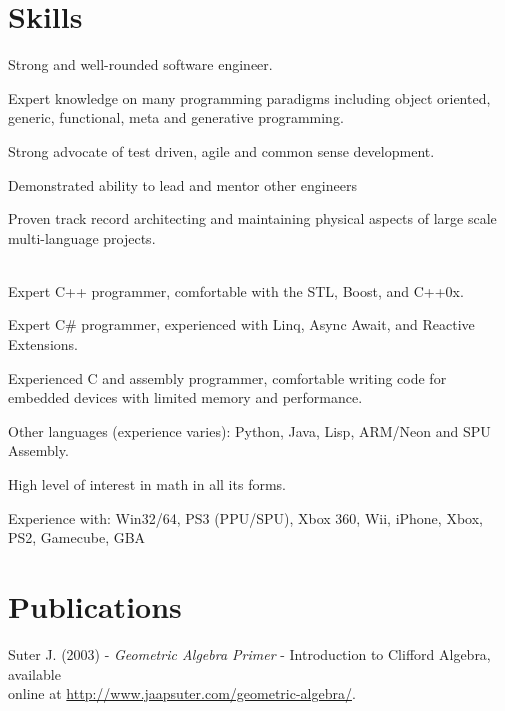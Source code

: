 \documentclass[margin, line]{resume}
\begin{document}
\begin{resume}
\section{\sc Skills}
\begin{list3}
\item Strong and well-rounded software engineer.
\item Expert knowledge on many programming paradigms including object oriented, generic, functional, meta and generative programming.
\item Strong advocate of test driven, agile and common sense development.
\item Demonstrated ability to lead and mentor other engineers
\item Proven track record architecting and maintaining physical aspects of large scale multi-language projects.
\\
\\
\item Expert C++ programmer, comfortable with the STL, Boost, and C++0x.
\item Expert C\# programmer, experienced with Linq, Async Await, and Reactive Extensions.
\item Experienced C and assembly programmer, comfortable writing code for embedded devices with limited memory and performance.
\item Other languages (experience varies): Python, Java, Lisp, ARM/Neon and SPU Assembly.
\\
\item High level of interest in math in all its forms.
\item Experience with: Win32/64, PS3 (PPU/SPU), Xbox 360, Wii, iPhone, Xbox, PS2, Gamecube, GBA
\end{list3}

\section{\sc Publications}
Suter J. (2003) - \textsl{Geometric Algebra Primer} - Introduction to Clifford Algebra, available\\ online at \url{http://www.jaapsuter.com/geometric-algebra/}.


\end{resume}
\end{document}
